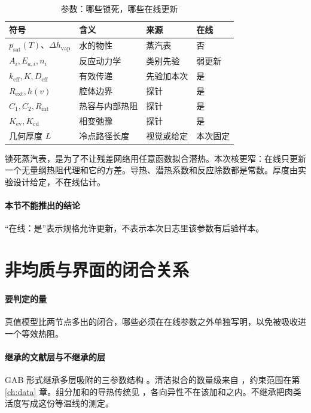 \begin{table}[ht]
\centering
\caption{参数：哪些锁死，哪些在线更新}
\begin{tabularx}{\textwidth}{lXll}
\toprule
符号 & 含义 & 来源 & 在线 \\
\midrule
\(p_{\mathrm{sat}}(T)\)、\(\Delta h_{\mathrm{vap}}\) & 水的物性 & 蒸汽表 & 否 \\
\(A_i,E_{a,i},n_i\) & 反应动力学 & 类别先验 & 弱更新 \\
\(k_{\mathrm{eff}},K,D_{\mathrm{eff}}\) & 有效传递 & 先验加本次 & 是 \\
\(R_{\mathrm{ext}},h(v)\) & 腔体边界 & 探针 & 是 \\
\(C_1,C_2,R_{\mathrm{int}}\) & 热容与内部热阻 & 探针 & 是 \\
\(K_{\mathrm{ev}},K_{\mathrm{cd}}\) & 相变弛豫 & 探针 & 是 \\
几何厚度 \(L\) & 冷点路径长度 & 视觉或给定 & 本次固定 \\
\bottomrule
\end{tabularx}
\end{table}

锁死蒸汽表，是为了不让残差网络用任意函数拟合潜热。本次核更窄：在线只更新一个无量纲热阻代理和它的方差。导热、潜热系数和反应除数都是常数。厚度由实验设计给定，不在线估计。

\paragraph{本节不能推出的结论}
“在线：是”表示规格允许更新，不表示本次日志里该参数有后验样本。

\section{非均质与界面的闭合关系}

\paragraph{要判定的量}
真值模型比两节点多出的闭合，哪些必须在在线参数之外单独写明，以免被吸收进一个等效热阻。

\paragraph{继承的文献层与不继承的层}
GAB 形式继承多层吸附的三参数结构 \cite{gab1980}。清洁拟合的数量级来自 \cite{sorption2026}，约束范围在第 \ref{ch:data} 章。组分加和的导热传统见 \cite{choi1986}，各向异性不在该加和之内。不继承把肉类活度写成这份等温线的测定。

